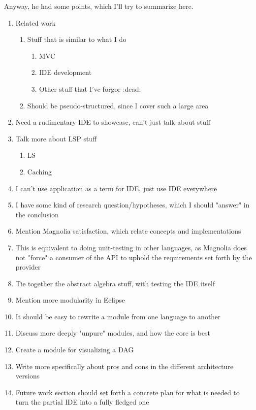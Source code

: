 Anyway, he had some points, which I'll try to summarize here.

\begin{enumerate}
  \item Related work
    \begin{enumerate}
      \item Stuff that is similar to what I do
        \begin{enumerate}
          \item MVC
          \item IDE development
          \item Other stuff that I've forgor :dead:
        \end{enumerate}
      \item Should be pseudo-structured, since I cover such a large area
    \end{enumerate}
  \item Need a rudimentary IDE to showcase, can't just talk about stuff
  \item Talk more about LSP stuff
    \begin{enumerate}
      \item LS
      \item Caching
    \end{enumerate}
  \item I can't use application as a term for IDE, just use IDE everywhere
  \item I have some kind of research question/hypotheses, which I should "answer"
    in the conclusion
  \item Mention Magnolia satisfaction, which relate concepts and implementations
  \item This is equivalent to doing unit-testing in other languages, as Magnolia
    does not "force" a consumer of the API to uphold the requirements set forth
    by the provider
  \item Tie together the abstract algebra stuff, with testing the IDE itself
  \item Mention more modularity in Eclipse
  \item It should be easy to rewrite a module from one language to another
  \item Discuss more deeply "unpure" modules, and how the core is best
  \item Create a module for visualizing a DAG
  \item Write more specifically about pros and cons in the different
    architecture versions
  \item Future work section should set forth a concrete plan for what is needed
    to turn the partial IDE into a fully fledged one
\end{enumerate}

